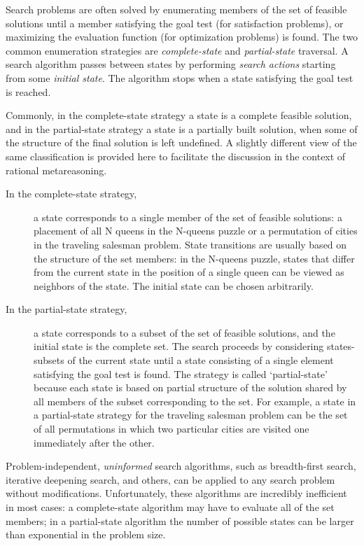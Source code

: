 Search problems are often solved by enumerating members of the set of
feasible solutions until a member satisfying the goal test (for
satisfaction problems), or maximizing the evaluation function (for
optimization problems) is found. The two common enumeration strategies
are {\em complete-state} and {\em partial-state} traversal. A search
algorithm passes between states by performing {\em search actions}
starting from some {\em initial state}. The algorithm stops when a
state satisfying the goal test is reached.

Commonly, in the complete-state strategy a state is a complete
feasible solution, and in the partial-state strategy a state is a
partially built solution, when some of the structure of the final
solution is left undefined. A slightly different view of the same
classification is provided here to facilitate the discussion in the
context of rational metareasoning.

\begin{description}
\item[In the complete-state strategy,] a state corresponds to a single
  member of the set of feasible solutions: a  placement
  of all N queens in the N-queens puzzle or a permutation of cities in the
  traveling salesman problem. State transitions are usually based on
  the structure of the set members: in the N-queens puzzle, states
  that differ from the current state in the position of a single queen can
  be viewed as neighbors of the state. The initial state can be
  chosen arbitrarily.

\item[In the partial-state strategy,] a state corresponds to a subset
  of the set of feasible solutions, and the initial state is the
 complete set. The search proceeds by considering states-subsets of
  the current state until a state consisting of a single element
  satisfying the goal test is found. The strategy is called
  `partial-state' because each state is based on partial structure of
  the solution shared by all members of the subset corresponding to
  the set. For example, a state in a partial-state strategy for the
  traveling salesman problem can be the set of all permutations in
  which two particular cities are visited one immediately after the
  other.
\end{description}

Problem-independent, {\it uninformed} search algorithms, such as
breadth-first search, iterative deepening search, and others, can be
applied to any search problem without modifications. Unfortunately,
these algorithms are incredibly inefficient in most cases: a
complete-state algorithm may have to evaluate all of the set members;
in a partial-state algorithm the number of possible states can be
larger than exponential in the problem size. 


